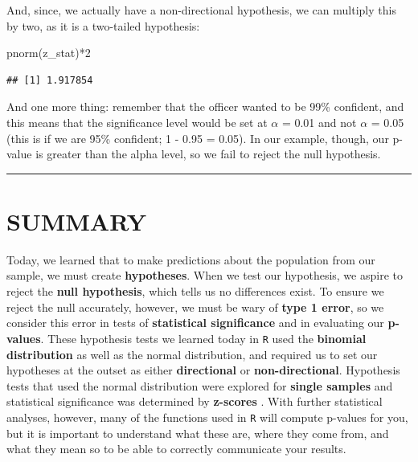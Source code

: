 \documentclass[
]{book}
\newenvironment{Shaded}{\begin{snugshade}}{\end{snugshade}}
\newcommand{\DecValTok}[1]{\textcolor[rgb]{0.00,0.00,0.81}{#1}}
\newcommand{\FunctionTok}[1]{\textcolor[rgb]{0.00,0.00,0.00}{#1}}
\newcommand{\NormalTok}[1]{#1}
\newcommand{\SpecialCharTok}[1]{\textcolor[rgb]{0.00,0.00,0.00}{#1}}
\begin{document}
And, since, we actually have a non-directional hypothesis, we can multiply this by two, as it is a two-tailed hypothesis:

\begin{Shaded}
\begin{Highlighting}[]
\FunctionTok{pnorm}\NormalTok{(z\_stat)}\SpecialCharTok{*}\DecValTok{2}
\end{Highlighting}
\end{Shaded}

\begin{verbatim}
## [1] 1.917854
\end{verbatim}

And one more thing: remember that the officer wanted to be 99\% confident, and this means that the significance level would be set at \(\alpha\) = 0.01 and not \(\alpha\) = 0.05 (this is if we are 95\% confident; 1 - 0.95 = 0.05). In our example, though, our p-value is greater than the alpha level, so we fail to reject the null hypothesis.

\begin{center}\rule{0.5\linewidth}{0.5pt}\end{center}

\hypertarget{summary-5}{%
\section{SUMMARY}\label{summary-5}}

Today, we learned that to make predictions about the population from our sample, we must create \textbf{hypotheses}. When we test our hypothesis, we aspire to reject the \textbf{null hypothesis}, which tells us no differences exist. To ensure we reject the null accurately, however, we must be wary of \textbf{type 1 error}, so we consider this error in tests of \textbf{statistical significance} and in evaluating our \textbf{p-values}. These hypothesis tests we learned today in \texttt{R} used the \textbf{binomial distribution} as well as the normal distribution, and required us to set our hypotheses at the outset as either \textbf{directional} or \textbf{non-directional}. Hypothesis tests that used the normal distribution were explored for \textbf{single samples} and statistical significance was determined by \textbf{z-scores} . With further statistical analyses, however, many of the functions used in \texttt{R} will compute p-values for you, but it is important to understand what these are, where they come from, and what they mean so to be able to correctly communicate your results.
\end{document}
